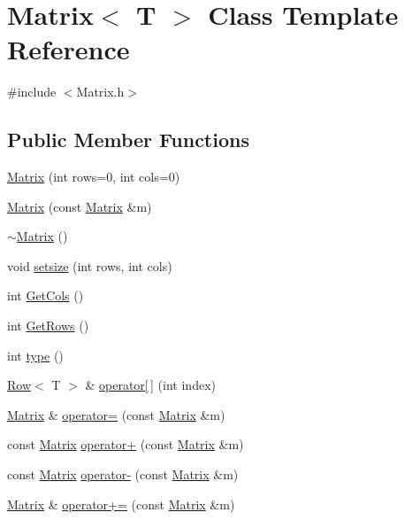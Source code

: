 \hypertarget{classMatrix}{
\section{Matrix$<$ T $>$ Class Template Reference}
\label{classMatrix}
}


{\ttfamily \#include $<$Matrix.h$>$}

\subsection*{Public Member Functions}
\begin{DoxyCompactItemize}
\item 
\hyperlink{classMatrix_a3ebbc04812668005b87e5c0cf28fa4ac}{Matrix} (int rows=0, int cols=0)
\item 
\hyperlink{classMatrix_a3796b4f32dc8e11f908a90fd3dd39c45}{Matrix} (const \hyperlink{classMatrix}{Matrix} \&m)
\item 
\hyperlink{classMatrix_a91aa704de674203e96aece9e1955ccd3}{$\sim$Matrix} ()
\item 
void \hyperlink{classMatrix_a8be203acf909fbb2050bf37470c88802}{setsize} (int rows, int cols)
\item 
int \hyperlink{classMatrix_a3ea3fe8edc613dc1f3ef33f0f0a06c61}{GetCols} ()
\item 
int \hyperlink{classMatrix_abc5ab9d53d31566a17dfc8a24fc60aa6}{GetRows} ()
\item 
int \hyperlink{classMatrix_af4fd573f5a962ec6c893051785f42480}{type} ()
\item 
\hyperlink{classRow}{Row}$<$ T $>$ \& \hyperlink{classMatrix_a5af1a30e7a004b1cefe7b3f5398bcc77}{operator\mbox{[}$\,$\mbox{]}} (int index)
\item 
\hyperlink{classMatrix}{Matrix} \& \hyperlink{classMatrix_a94508f84ba0d62e81aa8d508aa43f1ec}{operator=} (const \hyperlink{classMatrix}{Matrix} \&m)
\item 
const \hyperlink{classMatrix}{Matrix} \hyperlink{classMatrix_a311f3649e41cb4a3155f3f71a65829cb}{operator+} (const \hyperlink{classMatrix}{Matrix} \&m)
\item 
const \hyperlink{classMatrix}{Matrix} \hyperlink{classMatrix_a08e75978ea8288083ef36f53b4ac115d}{operator-\/} (const \hyperlink{classMatrix}{Matrix} \&m)
\item 
\hyperlink{classMatrix}{Matrix} \& \hyperlink{classMatrix_a480a72298ae1fc8443b0edfaa66d7c46}{operator+=} (const \hyperlink{classMatrix}{Matrix} \&m)
\item 

\end{DoxyCompactItemize}

